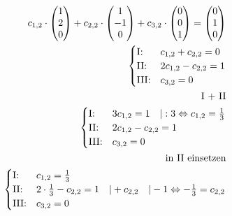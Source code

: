 \begin{align*}
    c_{1,2} \cdot \begin{pmatrix}
        1 \\ 2 \\ 0
    \end{pmatrix} + c_{2, 2} \cdot \begin{pmatrix}
        1 \\ -1 \\ 0
    \end{pmatrix} + c_{3, 2} \cdot \begin{pmatrix}
        0 \\ 0 \\ 1
    \end{pmatrix} = \begin{pmatrix}
        0 \\ 1 \\ 0
    \end{pmatrix} \\
    \begin{cases}
        \text{I:\@} & c_{1,2} + c_{2,2} = 0 \\
        \text{II:\@} & 2c_{1,2} - c_{2,2} = 1 \\
        \text{III:\@} & c_{3,2} = 0
    \end{cases} \\
    \text{I + II} \\
    \begin{cases}
        \text{I:\@} & 3c_{1,2}  = 1 \quad | : 3 \Leftrightarrow c_{1,2} = \frac{1}{3}\\
        \text{II:\@} & 2c_{1,2} - c_{2,2} = 1 \\
        \text{III:\@} & c_{3,2} = 0
    \end{cases} \\
    \text{in II einsetzen} \\
    \begin{cases}
        \text{I:\@} & c_{1,2} = \frac{1}{3}\\
        \text{II:\@} & 2 \cdot \frac{1}{3} - c_{2, 2} = 1 \quad | + c_{2, 2}  \quad | -1 \Leftrightarrow -\frac{1}{3} = c_{2, 2}\\
        \text{III:\@} & c_{3,2} = 0
    \end{cases} \\
\end{align*}

